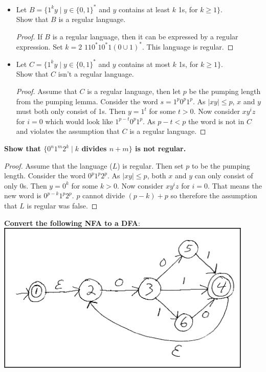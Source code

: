 \documentclass{article}
\begin{document}
        \begin{itemize}
            \item Let $B= \{1^ky\mid y\in \{0,1\}^*$ and $y$ contains at least $k$ 1s, for $k\geq 1\}$.\\
                  Show that $B$ is a regular language.
                  \begin{proof}
                      If $B$ is a regular language, then it can be expressed by a regular expression. Set $k=2$ $110^*10^*1(0\cup 1)^*$. This language is regular.
                  \end{proof}
            \item Let $C= \{1^k y\mid y\in \{0,1\}^* $ and $y$ contains at most $k$ 1s, for $k\geq 1\}$.\\
                  Show that $C$ isn't a regular language.
                  \begin{proof}
                      Assume that $C$ is a regular language, then let $p$ be the pumping length from the pumping lemma. Consider the word $s=1^p0^p1^p$. As $|xy|\leq p$, $x$ and $y$ must both only consist of 1s. Then $y=1^t$ for some $t>0$. Now consider $xy^iz$ for $i=0$ which would look like $1^{p-t}0^p1^p$. As $p-t<p$ the word is not in $C$ and violates the assumption that $C$ is a regular language.
                  \end{proof}
        \end{itemize}
    \textbf{Show that $\{0^n1^m2^k\mid k$ divides $n+m\}$ is not regular.}
        \begin{proof}
            Assume that the language ($L$) is regular. Then set $p$ to be the pumping length. Consider the word $0^p1^p2^p$. As $|xy|\leq p$, both $x$ and $y$ can only consist of only 0s. Then $y=0^k$ for some $k>0$. Now consider $xy^iz$ for $i=0$. That means the new word is $0^{p-k}1^p2^p$. $p$ cannot divide $(p-k) + p$ so therefore the assumption that $L$ is regular was false.
        \end{proof}
    \textbf{Convert the following NFA to a DFA}:\\
    \includegraphics[scale=0.75]{machine}\\
\end{document}
